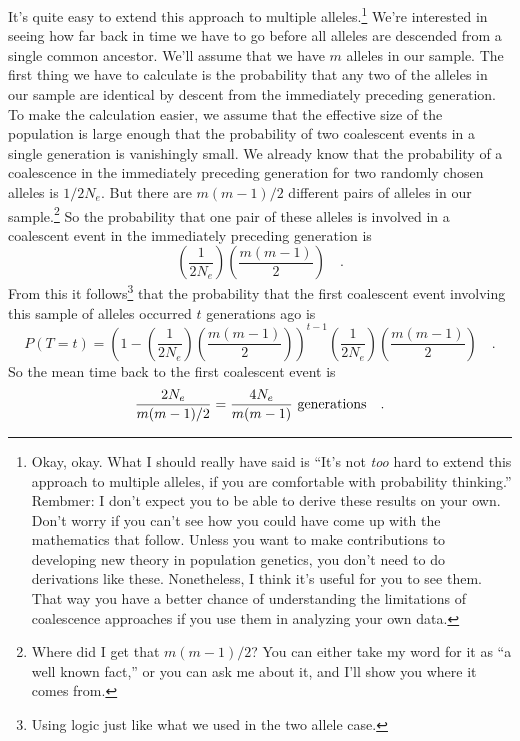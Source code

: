 It's quite easy to extend this approach to multiple
alleles.\footnote{Okay, okay. What I should really have said is ``It's
  not {\it too\/} hard to extend this approach to multiple alleles, if
  you are comfortable with probability thinking.'' Rembmer: I don't
  expect you to be able to derive these results on your own. Don't
  worry if you can't see how you could have come up with the
  mathematics that follow. Unless you want to make contributions to
  developing new theory in population genetics, you don't need to do
  derivations like these. Nonetheless, I think it's useful for you to
  see them. That way you have a better chance of understanding the
  limitations of coalescence approaches if you use them in analyzing
  your own data.}  We're interested in seeing how far back in time we
have to go before all alleles are descended from a single common
ancestor. We'll assume that we have $m$ alleles in our sample. The
first thing we have to calculate is the probability that any two of
the alleles in our sample are identical by descent from the
immediately preceding generation. To make the calculation easier, we
assume that the effective size of the population is large enough that
the probability of two coalescent events in a single generation is
vanishingly small. We already know that the probability of a
coalescence in the immediately preceding generation for two randomly
chosen alleles is $1/2N_e$. But there are $m(m-1)/2$ different pairs
of alleles in our sample.\footnote{Where did I get that $m(m-1)/2$?
  You can either take my word for it as ``a well known fact,'' or you
  can ask me about it, and I'll show you where it comes from.} So the
probability that one pair of these alleles is involved in a coalescent
event in the immediately preceding generation is
\begin{equation}
  \left(\frac{1}{2N_e}\right)\left(\frac{m(m-1)}{2}\right) \quad .
  \label{eq:multi-allele-first-event}
\end{equation}
From this it follows\footnote{Using logic just like what we used in
the two allele case.} that the probability that the first coalescent
event involving this sample of alleles occurred $t$ generations ago is
\begin{equation}
P(T=t) =
\left(1-\left(\frac{1}{2N_e}\right)\left(\frac{m(m-1)}{2}\right)\right)^{t-1}
\left(\frac{1}{2N_e}\right)\left(\frac{m(m-1)}{2}\right)
\quad .
\label{eq:multi-allele}
\end{equation}
So the mean time back to the first coalescent event is
\[
\frac{2N_e}{m(m-1)/2} = \frac{4N_e}{m(m-1)} \hbox{ generations} \quad .
\]

